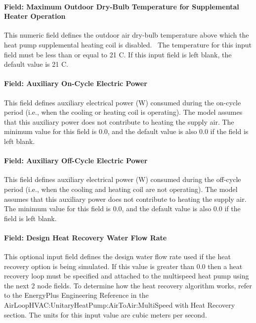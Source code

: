 \paragraph{Field: Maximum Outdoor Dry-Bulb Temperature for Supplemental Heater Operation}\label{field-maximum-outdoor-dry-bulb-temperature-for-supplemental-heater-operation-2}

This numeric field defines the outdoor air dry-bulb temperature above which the heat pump supplemental heating coil is disabled.~ The temperature for this input field must be less than or equal to 21 C. If this input field is left blank, the default value is 21 C.

\paragraph{Field: Auxiliary On-Cycle Electric Power}\label{field-auxiliary-on-cycle-electric-power}

This field defines auxiliary electrical power (W) consumed during the on-cycle period (i.e., when the cooling or heating coil is operating). The model assumes that this auxiliary power does not contribute to heating the supply air. The minimum value for this field is 0.0, and the default value is also 0.0 if the field is left blank.

\paragraph{Field: Auxiliary Off-Cycle Electric Power}\label{field-auxiliary-off-cycle-electric-power}

This field defines auxiliary electrical power (W) consumed during the off-cycle period (i.e., when the cooling and heating coil are not operating). The model assumes that this auxiliary power does not contribute to heating the supply air. The minimum value for this field is 0.0, and the default value is also 0.0 if the field is left blank.

\paragraph{Field: Design Heat Recovery Water Flow Rate}\label{field-design-heat-recovery-water-flow-rate-1-001}

This optional input field defines the design water flow rate used if the heat recovery option is being simulated. If this value is greater than 0.0 then a heat recovery loop must be specified and attached to the multispeed heat pump using the next 2 node fields. To determine how the heat recovery algorithm works, refer to the EnergyPlus Engineering Reference in the AirLoopHVAC:UnitaryHeatPump:AirToAir:MultiSpeed with Heat Recovery section. The units for this input value are cubic meters per second.

